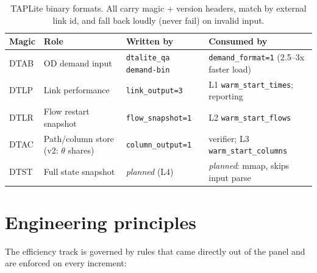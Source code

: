 \documentclass[10pt]{article}
\newcommand{\code}[1]{\texttt{#1}}
\begin{document}
\begin{table}[h]
\centering
\caption{TAPLite binary formats. All carry magic + version headers, match by
external link id, and fall back loudly (never fail) on invalid input.}
\label{tab:formats}
\begin{tabular}{llll}
\toprule
Magic & Role & Written by & Consumed by \\
\midrule
DTAB & OD demand input & \code{dtalite\_qa demand-bin} & \code{demand\_format=1} (2.5--3x faster load) \\
DTLP & Link performance & \code{link\_output=3} & L1 \code{warm\_start\_times}; reporting \\
DTLR & Flow restart snapshot & \code{flow\_snapshot=1} & L2 \code{warm\_start\_flows} \\
DTAC & Path/column store (v2: $\theta$ shares) & \code{column\_output=1} & verifier; L3 \code{warm\_start\_columns} \\
DTST & Full state snapshot & \emph{planned} (L4) & \emph{planned}: mmap, skips input parse \\
\bottomrule
\end{tabular}
\end{table}

\section{Engineering principles}
\label{sec:principles}

The efficiency track is governed by rules that came directly out of the panel
and are enforced on every increment:
\end{document}
